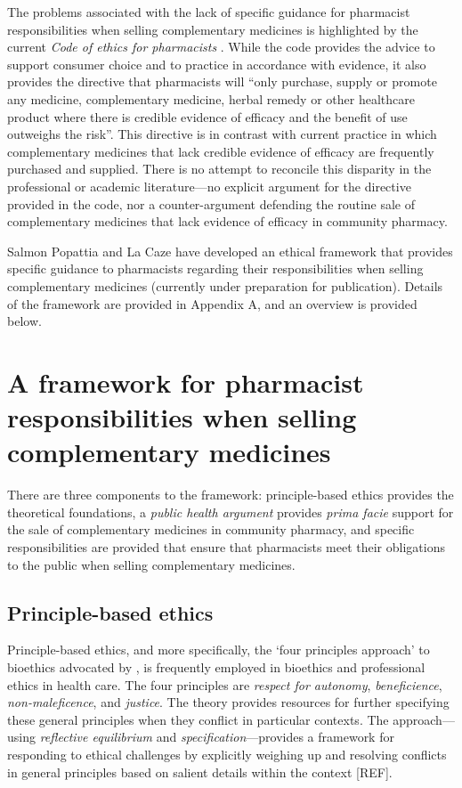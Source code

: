 \documentclass[11pt,a4paper]{article}
\begin{document}
The problems associated with the lack of specific guidance for
pharmacist responsibilities when selling complementary medicines is
highlighted by the current \emph{Code of ethics for pharmacists}
\autocite{PSA2017}. While the code provides the advice to support
consumer choice and to practice in accordance with evidence, it also
provides the directive that pharmacists will ``only purchase, supply or
promote any medicine, complementary medicine, herbal remedy or other
healthcare product where there is credible evidence of efficacy and the
benefit of use outweighs the risk''. This directive is in contrast with
current practice in which complementary medicines that lack credible
evidence of efficacy are frequently purchased and supplied. There is no
attempt to reconcile this disparity in the professional or academic
literature---no explicit argument for the directive provided in the
code, nor a counter-argument defending the routine sale of complementary
medicines that lack evidence of efficacy in community pharmacy.

Salmon Popattia and La Caze have developed an ethical framework that
provides specific guidance to pharmacists regarding their
responsibilities when selling complementary medicines (currently under
preparation for publication). Details of the framework are provided in
Appendix A, and an overview is provided below.

\section{A framework for pharmacist responsibilities when selling
complementary
medicines}\label{a-framework-for-pharmacist-responsibilities-when-selling-complementary-medicines}

There are three components to the framework: principle-based ethics
provides the theoretical foundations, a \emph{public health argument}
provides \emph{prima facie} support for the sale of complementary
medicines in community pharmacy, and specific responsibilities are
provided that ensure that pharmacists meet their obligations to the
public when selling complementary medicines.

\subsection{Principle-based ethics}\label{principle-based-ethics}

Principle-based ethics, and more specifically, the `four principles
approach' to bioethics advocated by \textcite{Beauchamp2012}, is
frequently employed in bioethics and professional ethics in health care.
The four principles are \emph{respect for autonomy},
\emph{beneficience}, \emph{non-maleficence}, and \emph{justice}. The
theory provides resources for further specifying these general
principles when they conflict in particular contexts. The
approach---using \emph{reflective equilibrium} and
\emph{specification}---provides a framework for responding to ethical
challenges by explicitly weighing up and resolving conflicts in general
principles based on salient details within the context {[}REF{]}.
\end{document}
